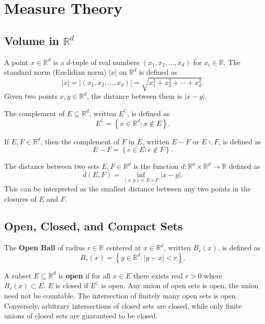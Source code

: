 \documentclass[12pt]{article}
\newcommand{\R}{\mathbb{R}}
\newcommand{\braceb}[1]{\left\{#1\right\}}
\newcommand{\vertb}[1]{\left\vert#1\right\vert}
\begin{document}
\pagestyle{fancy}

\setlength{\parindent}{0in}
\setlength{\parskip}{0.1in}

\section*{Measure Theory}

\subsection*{Volume in \( \R^d \)}

A point \( x \in \R^d \) is a \( d \)-tuple of real numbers
\( (x_1, x_2, \dots, x_d) \) for \( x_i \in \R \).
The standard norm (Euclidian norm) \( \vertb{x} \) on \( \R^d \) is
defined as
\[
	\vertb{x}
	= \vertb{(x_1, x_2, \dots, x_d )}
	= \sqrt{x_1^2 + x_2^2 + \cdots + x_d^2}.
\]
Given two points \( x, y \in \R^d \), the distance between them is
\( \vertb{x - y} \).

The complement of \( E \subseteq \R^d \), written \( E^\complement \), is
defined as
\[
	E^\complement = \braceb{x \in \R^d : x \notin E}.
\]

If \( E, F \in \R^d \), then the complement of \( F \) in \( E \), written
\( E - F \) or \( E \backslash F \), is defined as
\[
	E - F = \braceb{e \in E : e \notin F}.
\]

The distance between two sets \( E, F \in \R^d \) is the function
\( d : \R^d \times \R^d \to \R \) defined as
\[
	d(E, F) = \inf_{(x, y) \in E \times F} \vertb{x - y}.
\]
This can be interpreted as the smallest distance between any two points in the
closures of \( E \) and \( F \).

\subsection*{Open, Closed, and Compact Sets}

The \textbf{Open Ball} of radius \( r \in \R \) centered at \( x \in \R^d \),
written \( B_r(x) \), is defined as
\[
	B_r(x) = \braceb{y \in \R^d : \vertb{y - x} < r}.
\]

A subset \( E \subseteq \R^d \) is \textbf{open} if for all \( x \in E \)
there exists real \( r > 0 \) where \( B_r(x) \subset E \).
\( E \) is closed if \( E^\complement \) is open.
Any union of open sets is open, the union need not be countable.
The intersection of finitely many open sets is open.
Conversely, arbitrary intersections of closed sets are closed, while only
finite unions of closed sets are guaranteed to be closed.
\end{document}
